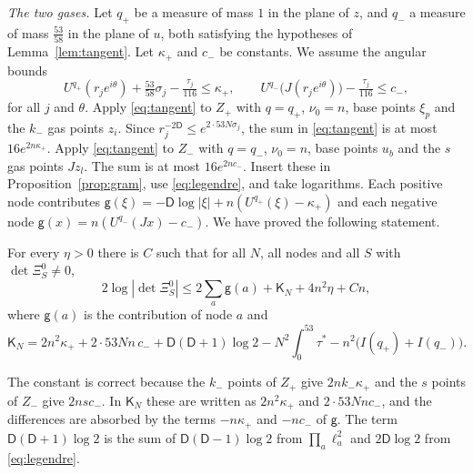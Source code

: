 \emph{The two gases.} Let $q_+$ be a measure of mass $1$ in the plane of $z$, and $q_-$ a measure of mass $\frac{53}{58}$ in the plane of
$u$, both satisfying the hypotheses of Lemma~\ref{lem:tangent}. Let $\kappa_+$ and $c_-$ be constants. We assume the angular bounds
\begin{equation}\label{eq:angular}
 U^{q_+}(r_je^{i\theta})+\tfrac{53}{58}\sigma_j-\tfrac{\tau_j}{116}\le\kappa_+,\qquad
 U^{q_-}\bigl(J(r_je^{i\theta})\bigr)-\tfrac{\tau_j}{116}\le c_-,
\end{equation}
for all $j$ and $\theta$. Apply \eqref{eq:tangent} to $Z_+$ with $q=q_+$, $\nu_0=n$, base points $\xi_p$ and the $k_-$ gas points $z_i$. Since
$r_j^{-2\mathsf D}\le e^{2\cdot53N\sigma_j}$, the sum in \eqref{eq:tangent} is at most $16e^{2n\kappa_+}$. Apply \eqref{eq:tangent} to $Z_-$ with $q=q_-$,
$\nu_0=n$, base points $u_b$ and the $s$ gas points $Jz_l$. The sum is at most $16e^{2nc_-}$. Insert these in
Proposition~\ref{prop:gram}, use \eqref{eq:legendre}, and take logarithms. Each positive node contributes
$\mathsf g(\xi)=-\mathsf D\log|\xi|+n(U^{q_+}(\xi)-\kappa_+)$ and each negative node $\mathsf g(x)=n(U^{q_-}(Jx)-c_-)$. We have proved the following statement.

\begin{proposition}\label{prop:gas}
For every $\eta>0$ there is $C$ such that for all $N$, all nodes and all $S$ with $\det\Xi^0_S\ne0$,
\[
 2\log|\det\Xi^0_S|\le2\sum_a\mathsf g(a)+\mathsf K_N+4n^2\eta+Cn,
\]
where $\mathsf g(a)$ is the contribution of node $a$ and
\[
 \mathsf K_N=2n^2\kappa_++2\cdot53Nn\,c_-+\mathsf D(\mathsf D+1)\log2-N^2\int_0^{53}\tau^*-n^2\bigl(I(q_+)+I(q_-)\bigr).
\]
\end{proposition}

The constant is correct because the $k_-$ points of $Z_+$ give $2nk_-\kappa_+$ and the $s$ points of $Z_-$ give $2nsc_-$. In $\mathsf K_N$ these are
written as $2n^2\kappa_+$ and $2\cdot53Nnc_-$, and the differences are absorbed by the terms $-n\kappa_+$ and $-nc_-$ of $\mathsf g$. The term $\mathsf D(\mathsf D+1)\log2$
is the sum of $\mathsf D(\mathsf D-1)\log2$ from $\prod_a\ell_a^2$ and $2\mathsf D\log2$ from \eqref{eq:legendre}.

